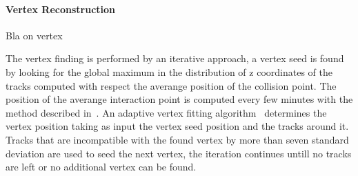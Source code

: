 
\paragraph{Vertex Reconstruction}
Bla on vertex

The vertex finding is performed by an iterative approach, a vertex seed is found by  
looking for the global maximum in the distribution of z coordinates of
the tracks computed with respect the averange position of the collision point. The position of the averange interaction point 
is computed every few minutes with the method described in~\cite{beamspot}.
An adaptive vertex fitting algorithm~\cite{Vertex} determines the vertex position taking as input the vertex seed position and the 
tracks around it. Tracks that are incompatible with the found vertex by more than seven standard deviation
are used to seed the next vertex, the iteration continues untill no tracks are left or no additional vertex can be found.


